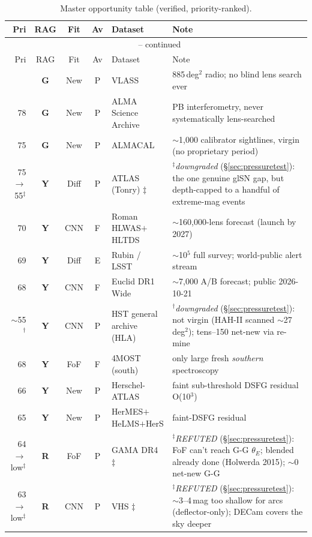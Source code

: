 \documentclass[11pt,letterpaper]{article}
\newcommand{\rgG}{\textcolor{green!55!black}{\textbf{G}}}
\newcommand{\rgY}{\textcolor{orange!85!black}{\textbf{Y}}}
\newcommand{\rgR}{\textcolor{red!72!black}{\textbf{R}}}
\begin{document}
{\footnotesize
\begin{longtable}{@{}r c c c >{\raggedright\arraybackslash}p{3.3cm} >{\raggedright\arraybackslash}p{6.2cm}@{}}
\caption{Master opportunity table (verified, priority-ranked).}\label{tab:master}\\
\toprule
Pri & RAG & Fit & Av & Dataset & Note \\ \midrule
\endfirsthead
\multicolumn{6}{c}{\tablename~\thetable{} -- continued}\\ \toprule
Pri & RAG & Fit & Av & Dataset & Note \\ \midrule
\endhead
\bottomrule
\endfoot
78 & \rgG & New & P & VLASS & 33{,}885\,deg$^2$ radio; no blind lens search ever \\
78 & \rgG & New & P & ALMA Science Archive & PB interferometry, never systematically lens-searched \\
75 & \rgG & New & P & ALMACAL & $\sim$1{,}000 calibrator sightlines, virgin (no proprietary period) \\
75$\to$55$^\ddagger$ & \rgY & Diff & P & ATLAS (Tonry) $\ddagger$ & $^\ddagger$\emph{downgraded} (\S\ref{sec:pressuretest}): the one genuine glSN gap, but depth-capped to a handful of extreme-mag events \\
70 & \rgY & CNN & F & Roman HLWAS$+$HLTDS & $\sim$160{,}000-lens forecast (launch by 2027) \\
69 & \rgY & Diff & E & Rubin / LSST & $\sim$10$^5$ full survey; world-public alert stream \\
68 & \rgY & CNN & F & Euclid DR1 Wide & $\sim$7{,}000 A/B forecast; public 2026-10-21 \\
$\sim$55$^\dagger$ & \rgY & CNN & P & HST general archive (HLA) & $^\dagger$\emph{downgraded} (\S\ref{sec:pressuretest}): not virgin (HAH-II scanned $\sim$27\,deg$^2$); tens--150 net-new via re-mine \\
68 & \rgY & FoF & F & 4MOST (south) & only large fresh \emph{southern} spectroscopy \\
66 & \rgY & New & P & Herschel-ATLAS & faint sub-threshold DSFG residual O(10$^3$) \\
65 & \rgY & New & P & HerMES$+$HeLMS$+$HerS & faint-DSFG residual \\
64$\to$low$^\ddagger$ & \rgR & FoF & P & GAMA DR4 $\ddagger$ & $^\ddagger$\emph{REFUTED} (\S\ref{sec:pressuretest}): FoF can't reach G-G $\theta_E$; blended already done (Holwerda 2015); $\sim$0 net-new G-G \\
63$\to$low$^\ddagger$ & \rgR & CNN & P & VHS $\ddagger$ & $^\ddagger$\emph{REFUTED} (\S\ref{sec:pressuretest}): $\sim$3--4\,mag too shallow for arcs (deflector-only); DECam covers the sky deeper \\

\end{longtable}}
\end{document}
